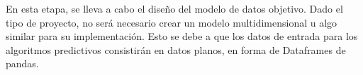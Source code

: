En esta etapa, se lleva a cabo el diseño del modelo de datos objetivo. Dado el tipo de proyecto, no será necesario crear un modelo multidimensional u algo similar para su implementación. Esto se debe a que los datos de entrada para los algoritmos predictivos consistirán en datos planos, en forma de Dataframes de pandas.